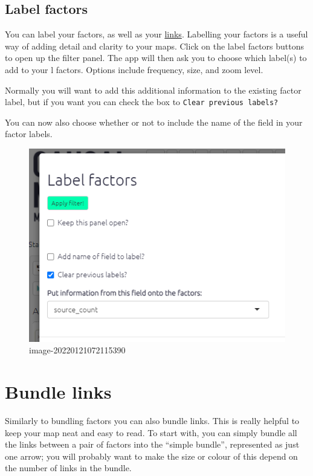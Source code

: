 \documentclass[
]{book}
\begin{document}
\hypertarget{xlabel-factors}{%
\subsection{Label factors}\label{xlabel-factors}}

You can label your factors, as well as your \protect\hyperlink{xformattinglinks}{links}. Labelling your factors is a useful way of adding detail and clarity to your maps. Click on the label factors buttons to open up the filter panel. The app will then ask you to choose which label(s) to add to your l factors. Options include frequency, size, and zoom level.

Normally you will want to add this additional information to the existing factor label, but if you want you can check the box to \texttt{Clear\ previous\ labels?}

You can now also choose whether or not to include the name of the field in your factor labels.

\begin{figure}
\centering
\includegraphics{_assets/image-20220121072115390.png}
\caption{image-20220121072115390}
\end{figure}

\hypertarget{bundlelinks}{%
\section{Bundle links}\label{bundlelinks}}

Similarly to bundling factors you can also bundle links. This is really helpful to keep your map neat and easy to read. To start with, you can simply bundle all the links between a pair of factors into the ``simple bundle'', represented as just one arrow; you will probably want to make the size or colour of this depend on the number of links in the bundle.
\end{document}
